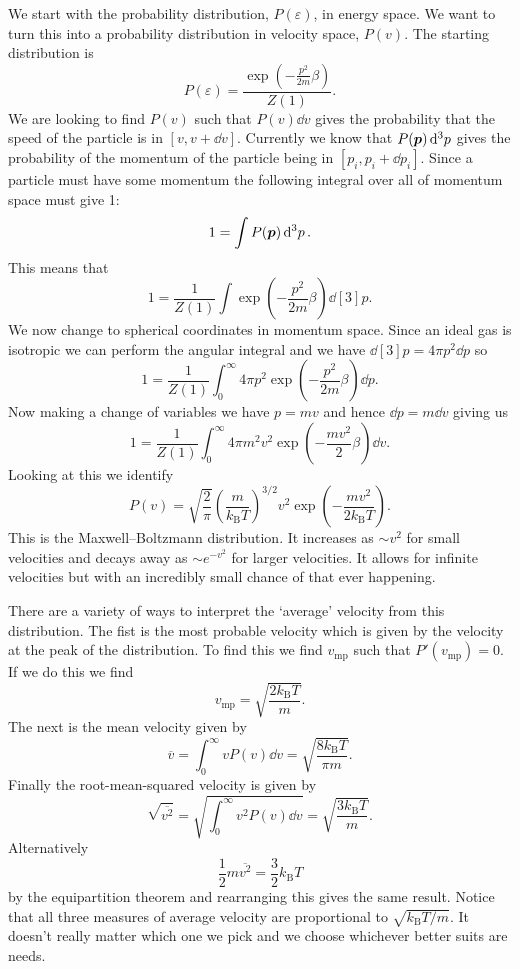 \documentclass[a4paper]{article}
\newcommand{\boltzmann}{k_\mathrm{B}}
\newcommand{\mean}[1]{\overline{#1}}
\begin{document}
    We start with the probability distribution, \(P(\varepsilon)\), in energy space.
    We want to turn this into a probability distribution in velocity space, \(P(v)\).
    The starting distribution is
    \[P(\varepsilon) = \frac{\exp\left( -\frac{p^2}{2m}\beta \right)}{Z(1)}.\]
    We are looking to find \(P(v)\) such that \(P(v)\dd{v}\) gives the probability that the speed of the particle is in \([v, v + \dd{v}]\).
    Currently we know that \(P(\bm{p})\dd[3]{p}\) gives the probability of the momentum of the particle being in \([p_i, p_i + \dd{p_i}]\).
    Since a particle must have some momentum the following integral over all of momentum space must give 1:
    \[1 = \int P(\bm{p})\dd[3]{p}.\]
    This means that
    \[1 = \frac{1}{Z(1)} \int \exp\left( -\frac{p^2}{2m}\beta \right) \dd[3]{p}.\]
    We now change to spherical coordinates in momentum space.
    Since an ideal gas is isotropic we can perform the angular integral and we have \(\dd[3]{p} = 4\pi p^2\dd{p}\) so
    \[1 = \frac{1}{Z(1)} \int_{0}^{\infty} 4\pi p^2 \exp\left( -\frac{p^2}{2m}\beta \right)\dd{p}.\]
    Now making a change of variables we have \(p = mv\) and hence \(\dd{p} = m\dd{v}\) giving us
    \[1 = \frac{1}{Z(1)} \int_{0}^{\infty} 4\pi m^2v^2 \exp\left( -\frac{mv^2}{2}\beta \right)\dd{v}.\]
    Looking at this we identify
    \[P(v) = \sqrt{\frac{2}{\pi}} \left( \frac{m}{\boltzmann T} \right)^{3/2}v^2\exp\left( -\frac{mv^2}{2\boltzmann T} \right).\]
    This is the Maxwell--Boltzmann distribution.
    It increases as \(\sim v^2\) for small velocities and decays away as \(\sim e^{-v^2}\) for larger velocities.
    It allows for infinite velocities but with an incredibly small chance of that ever happening.
    
    There are a variety of ways to interpret the `average' velocity from this distribution.
    The fist is the most probable velocity which is given by the velocity at the peak of the distribution.
    To find this we find \(v_{\mathrm{mp}}\) such that \(P'(v_{\mathrm{mp}}) = 0\).
    If we do this we find
    \[v_{\mathrm{mp}} = \sqrt{\frac{
        2\boltzmann T}{m}}.\]
    The next is the mean velocity given by
    \[\mean{v} = \int_0^{\infty} vP(v)\dd{v} = \sqrt{\frac{8\boltzmann T}{\pi m}}.\]
    Finally the root-mean-squared velocity is given by
    \[\sqrt{\mean{v^2}} = \sqrt{\int_0^{\infty} v^2P(v)\dd{v}} = \sqrt{\frac{3\boltzmann T}{m}}.\]
    Alternatively
    \[\frac{1}{2}m\mean{v^2} = \frac{3}{2}\boltzmann T\]
    by the equipartition theorem and rearranging this gives the same result.
    Notice that all three measures of average velocity are proportional to \(\sqrt{\boltzmann T/m}\).
    It doesn't really matter which one we pick and we choose whichever better suits are needs.
    
\end{document}
